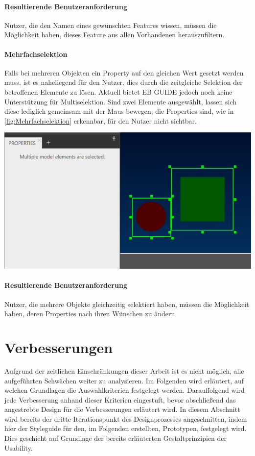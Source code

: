 \paragraph{Resultierende Benutzeranforderung}
Nutzer, die den Namen eines gewünschten Features wissen, müssen die Möglichkeit haben, dieses Feature aus allen Vorhandenen herauszufiltern.

\paragraph{Mehrfachselektion}
Falls bei mehreren Objekten ein Property auf den gleichen Wert gesetzt werden muss, ist es naheliegend für den Nutzer, dies durch die zeitgleiche Selektion der betroffenen Elemente zu lösen.
Aktuell bietet EB GUIDE jedoch noch keine Unterstützung für Multiselektion.
Sind zwei Elemente ausgewählt, lassen sich diese lediglich gemeinsam mit der Maus bewegen; die Properties sind, wie in \cref{fig:Mehrfachselektion} erkennbar, für den Nutzer nicht sichtbar.

\begin{center}
  \includegraphics[scale=0.8]{figures/Mehrfachselektion.png}
  \label{fig:Mehrfachselektion}
\end{center}

\paragraph{Resultierende Benutzeranforderung}
Nutzer, die mehrere Objekte gleichzeitig selektiert haben, müssen die Möglichkeit haben, deren Properties nach ihren Wünschen zu ändern.

\section{Verbesserungen}
Aufgrund der zeitlichen Einschränkungen dieser Arbeit ist es nicht möglich, alle aufgeführten Schwächen weiter zu analysieren. 
Im Folgenden wird erläutert, auf welchen Grundlagen die Auswahlkriterien festgelegt werden.
Darauffolgend wird jede Verbesserung anhand dieser Kriterien eingestuft, bevor abschließend das angestrebte Design für die Verbesserungen erläutert wird.
In diesem Abschnitt wird bereits der dritte Iterationspunkt des Designprozesses angeschnitten, indem hier der Styleguide für den, im Folgenden erstellten, Prototypen, festgelegt wird. Dies geschieht auf Grundlage der bereits erläuterten Gestaltprinzipien der Usability.

